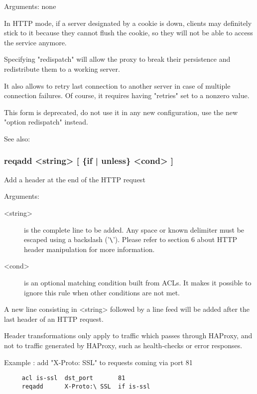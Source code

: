 
  Arguments: none

  In HTTP mode, if a server designated by a cookie is down, clients may
  definitely stick to it because they cannot flush the cookie, so they will not
  be able to access the service anymore.

  Specifying "redispatch" will allow the proxy to break their persistence and
  redistribute them to a working server.

  It also allows to retry last connection to another server in case of multiple
  connection failures. Of course, it requires having "retries" set to a nonzero
  value.

  This form is deprecated, do not use it in any new configuration, use the new
  "option redispatch" instead.

  See also: 

\subsubsection[reqadd]{reqadd  <string> [ \{if | unless\} <cond> ]}


  Add a header at the end of the HTTP request


  Arguments:
  
\begin{description}
\item[<string>] is the complete line to be added. Any space or known delimiter
              must be escaped using a backslash ('\verb|\|'). Please refer to section
              6 about HTTP header manipulation for more information.

\item[<cond>] is an optional matching condition built from ACLs. It makes it
              possible to ignore this rule when other conditions are not met.
\end{description}

  A new line consisting in <string> followed by a line feed will be added after
  the last header of an HTTP request.

  Header transformations only apply to traffic which passes through HAProxy,
  and not to traffic generated by HAProxy, such as health-checks or error
  responses.

  Example : add "X-Proto: SSL" to requests coming via port 81
\begin{verbatim}
     acl is-ssl  dst_port       81
     reqadd      X-Proto:\ SSL  if is-ssl
\end{verbatim}


